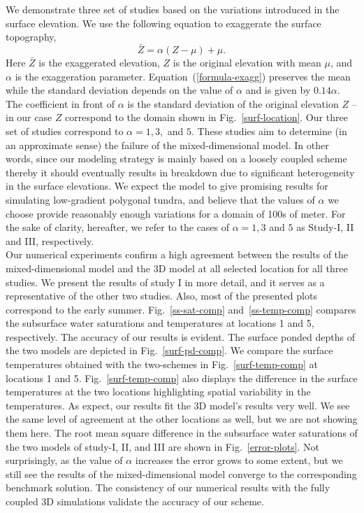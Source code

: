 \documentclass[review]{elsarticle}
\begin{document}
We demonstrate three set of studies based on the variations introduced in the surface elevation. We use the following equation to exaggerate the surface topography,
\begin{equation}\label{formula-exagg}
\bar{Z} =  \alpha (Z - \mu) + \mu.
\end{equation}
Here $\bar{Z}$ is the exaggerated elevation, $Z$ is the original elevation with mean $\mu$, and $\alpha$ is the exaggeration parameter. Equation~(\ref{formula-exagg})  preserves the mean while the standard deviation depends on the value of $\alpha$ and is given by $0.14 \alpha$. The coefficient in front of $\alpha$ is the standard deviation of the original elevation $Z$ -- in our case $Z$ correspond to the domain shown in Fig.~\ref{surf-location}. Our three set of studies correspond to $\alpha=1,3,$ and $5$.
These studies aim to determine (in an approximate sense) the failure of the mixed-dimensional model. In other words, since our modeling strategy is mainly based on a loosely coupled scheme thereby it should eventually results in breakdown due to significant heterogeneity in the surface elevations. We expect the model to give promising results for simulating low-gradient polygonal tundra, and believe that the values of $\alpha$ we choose provide reasonably enough variations for a domain of 100s of meter. For the sake of clarity, hereafter, we refer to the cases of $\alpha = 1, 3$ and $5$ as Study-I, II and III, respectively. \\
Our numerical experiments confirm a high agreement between the results of the mixed-dimensional model and the 3D model at all selected location for all three studies. We present the results of study I in more detail, and it serves as a representative of the other two studies. Also, most of the presented plots correspond to the early summer. Fig.~\ref{ss-sat-comp} and~\ref{ss-temp-comp} compares the subsurface water saturations and temperatures at locations 1 and 5, respectively. The accuracy of our results is evident. The surface ponded depths of the two models are depicted in Fig.~\ref{surf-pd-comp}.  We compare the surface temperatures obtained with the two-schemes in Fig.~\ref{surf-temp-comp} at locations 1 and 5. Fig.~\ref{surf-temp-comp} also displays the difference in the surface temperatures at the two locations highlighting spatial variability in the temperatures. As expect, our results fit the 3D model's results very well. We see the same level of agreement at the other locations as well, but we are not showing them here.
The root mean square difference in the subsurface water saturations of the two models of study-I, II, and III are shown in Fig.~\ref{error-plots}. Not surprisingly, as the value of $\alpha$ increases the error grows to some extent, but we still see the results of the mixed-dimensional model converge to the corresponding benchmark solution. The consistency of our numerical results with the fully coupled 3D simulations validate the accuracy of our scheme. 
\end{document}
